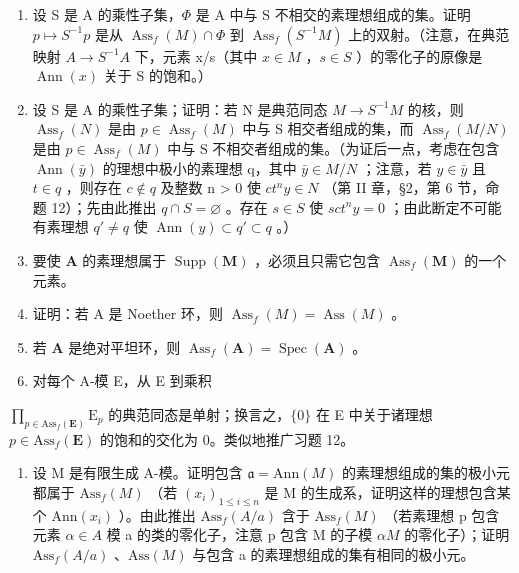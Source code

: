 \begin{enumerate}
\def\labelenumi{(\alph{enumi})}
\setcounter{enumi}{3}
\item
  设 S 是 A 的乘性子集，\(\Phi\) 是 A 中与 S 不相交的素理想组成的集。证明 \(p \mapsto S^{-1}p\) 是从 \(\operatorname{Ass}_{f}(M) \cap \Phi\) 到 \(\operatorname{Ass}_{f}(S^{-1}M)\) 上的双射。（注意，在典范映射 \(A \to S^{-1}A\) 下，元素 x/s（其中 \(x \in M\) ，\(s \in S\) ）的零化子的原像是 \(\operatorname{Ann}(x)\) 关于 S 的饱和。）
\item
  设 S 是 A 的乘性子集；证明：若 N 是典范同态 \(M \to S^{-1}M\) 的核，则 \(\operatorname{Ass}_{f}(N)\) 是由 \(p \in \operatorname{Ass}_{f}(M)\) 中与 S 相交者组成的集，而 \(\operatorname{Ass}_{f}(M/N)\) 是由 \(p \in \operatorname{Ass}_{f}(M)\) 中与 S 不相交者组成的集。（为证后一点，考虑在包含 \(\operatorname{Ann}(\bar{y})\) 的理想中极小的素理想 q，其中 \(\bar{y} \in M/N\) ；注意，若 \(y \in \bar{y}\) 且 \(t \in q\) ，则存在 \(c \notin q\) 及整数 n \textgreater{} 0 使 \(ct^{n}y \in N\) （第 II 章，§2，第 6 节，命题 12）；先由此推出 \(q \cap S = \varnothing\) 。存在 \(s \in S\) 使 \(sct^{n}y = 0\) ；由此断定不可能有素理想 \(q' \neq q\) 使 \(\operatorname{Ann}(y) \subset q' \subset q\) 。）
\item
  要使 \(\mathbf{A}\) 的素理想属于 \(\operatorname{Supp}(\mathbf{M})\) ，必须且只需它包含 \(\operatorname{Ass}_f(\mathbf{M})\) 的一个元素。
\item
  证明：若 A 是 Noether 环，则 \(\operatorname{Ass}_f(M) = \operatorname{Ass}(M)\) 。
\item
  若 \(\mathbf{A}\) 是绝对平坦环，则 \(\operatorname{Ass}_f(\mathbf{A}) = \operatorname{Spec}(\mathbf{A})\) 。
\item
  对每个 A-模 E，从 E 到乘积
\end{enumerate}

\(\prod_{p\in\mathrm{Ass}_{f}(\mathbf{E})}\mathrm{E}_{p}\) 的典范同态是单射；换言之，\(\{0\}\) 在 E 中关于诸理想 \(p\in\mathrm{Ass}_{f}(\mathbf{E})\) 的饱和的交化为 0。类似地推广习题 12。

\begin{enumerate}
\def\labelenumi{(\alph{enumi})}
\setcounter{enumi}{9}
\tightlist
\item
  设 M 是有限生成 A-模。证明包含 \(\mathfrak{a} = \text{Ann}(M)\) 的素理想组成的集的极小元都属于 \(\text{Ass}_{f}(M)\) （若 \((x_{i})_{1 \leq i \leq n}\) 是 M 的生成系，证明这样的理想包含某个 \(\text{Ann}(x_{i})\) ）。由此推出 \(\text{Ass}_{f}(A/a)\) 含于 \(\text{Ass}_{f}(M)\) （若素理想 p 包含元素 \(\alpha \in A\) 模 a 的类的零化子，注意 p 包含 M 的子模 \(\alpha M\) 的零化子）；证明 \(\text{Ass}_{f}(A/a)\) 、\(\text{Ass}(M)\) 与包含 a 的素理想组成的集有相同的极小元。
\end{enumerate}

